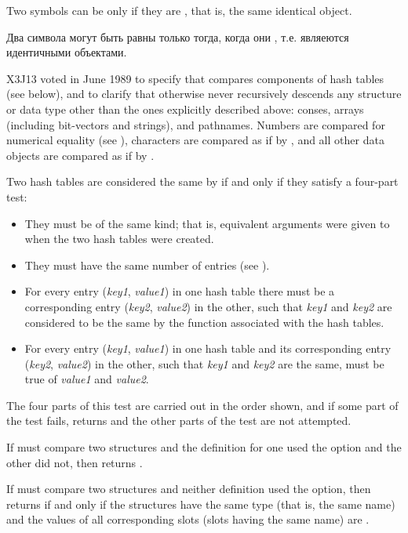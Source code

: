\begin{defun}[Function]
Two symbols can be  only if they are , that is, the same
identical object.

Два символа могут быть равны  только тогда, когда они ,
т.е. являеются идентичными объектами.

\begin{new}
X3J13 voted in June 1989
to specify that  compares components
of hash tables (see below), and to
clarify that otherwise  never recursively
descends any structure or data type other than the ones explicitly
described above: conses, arrays (including bit-vectors and strings), and pathnames.
Numbers are compared for numerical equality (see \cdf{=}),
characters are compared as if by , and all other
data objects are compared as if by .

Two hash tables are considered the same by  if and only if
they satisfy a four-part test:
\begin{itemize}
\item They must be
of the same kind; that is, equivalent  arguments were given to
 when the two hash tables were created.

\item They must have the same number of entries (see ).

\item For every entry (\emph{key1}, \emph{value1\/}) in one hash table
there must be a corresponding entry (\emph{key2}, \emph{value2\/}) in the
other, such that \emph{key1} and \emph{key2} are considered to be the same
by the  function associated with the hash tables.

\item For every entry (\emph{key1}, \emph{value1\/}) in one hash table
and its corresponding entry (\emph{key2}, \emph{value2\/}) in the
other, such that \emph{key1} and \emph{key2} are the same,
 must be true of \emph{value1} and \emph{value2}.
\end{itemize}
The four parts of this test are carried out in the order shown, and
if some part of the test fails,  returns  and
the other parts of the test are not attempted.

If  must compare two structures and the 
definition for one used the  option and the other did not,
then  returns .

If  must compare two structures and neither 
definition used the  option,
then  returns  if and only if the structures have the
same type (that is, the same  name) and the values
of all corresponding slots (slots having the same name) are .


\end{new}
\end{defun}
